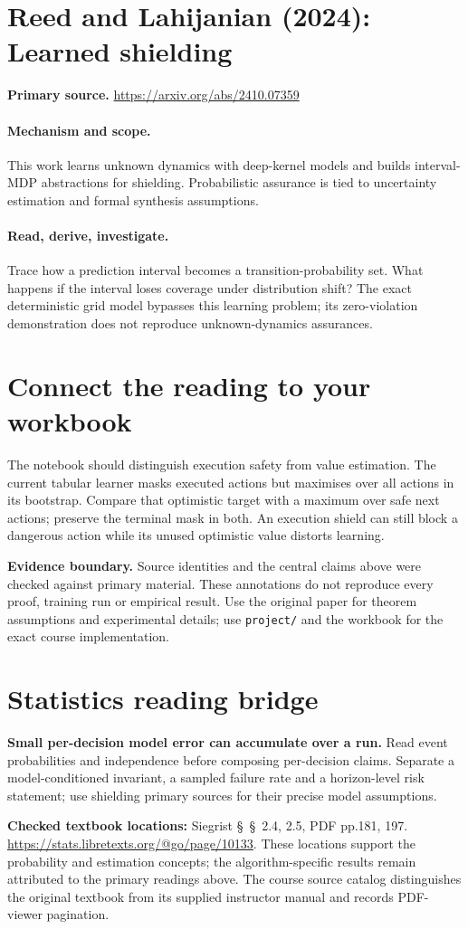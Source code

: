 \documentclass[11pt]{scrartcl}
\begin{document}
\section{Reed and Lahijanian (2024): Learned shielding}
\noindent\textbf{Primary source.} \url{https://arxiv.org/abs/2410.07359}

\paragraph{Mechanism and scope.} This work learns unknown dynamics with deep-kernel models and builds interval-MDP abstractions for shielding. Probabilistic assurance is tied to uncertainty estimation and formal synthesis assumptions.

\paragraph{Read, derive, investigate.} Trace how a prediction interval becomes a transition-probability set. What happens if the interval loses coverage under distribution shift? The exact deterministic grid model bypasses this learning problem; its zero-violation demonstration does not reproduce unknown-dynamics assurances.

\section*{Connect the reading to your workbook}
The notebook should distinguish execution safety from value estimation. The current tabular learner masks executed actions but maximises over all actions in its bootstrap. Compare that optimistic target with a maximum over safe next actions; preserve the terminal mask in both. An execution shield can still block a dangerous action while its unused optimistic value distorts learning.

\noindent\textbf{Evidence boundary.} Source identities and the central claims above were checked against primary material. These annotations do not reproduce every proof, training run or empirical result. Use the original paper for theorem assumptions and experimental details; use \texttt{project/} and the workbook for the exact course implementation.
\section*{Statistics reading bridge}
\textbf{Small per-decision model error can accumulate over a run.} Read event probabilities and independence before composing per-decision claims. Separate a model-conditioned invariant, a sampled failure rate and a horizon-level risk statement; use shielding primary sources for their precise model assumptions.

\textbf{Checked textbook locations:} Siegrist \S~\S~2.4, 2.5, PDF pp.181, 197. \url{https://stats.libretexts.org/@go/page/10133}. These locations support the probability and estimation concepts; the algorithm-specific results remain attributed to the primary readings above. The course source catalog distinguishes the original textbook from its supplied instructor manual and records PDF-viewer pagination.
\end{document}
